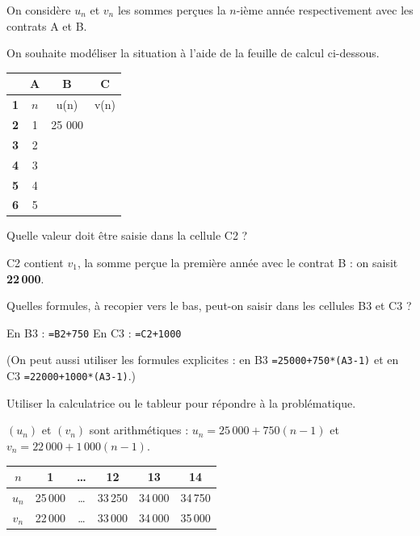 \documentclass[12pt,a4paper]{book}
\begin{document}
On considère $u_n$ et $v_n$ les sommes perçues la $n$-ième année respectivement avec les contrats A et B.

\begin{enumMet}
	\item On souhaite modéliser la situation à l'aide de la feuille de calcul ci-dessous.

\begin{center}
\begin{tabular}{|c|c|c|c|}
	\hline
	 & \textbf{A} & \textbf{B} & \textbf{C} \\
	\hline
	\textbf{1} & $n$ & u(n) & v(n) \\
	\hline
	\textbf{2} & 1 & 25 000 & \\
	\hline
	\textbf{3} & 2 & & \\
	\hline
	\textbf{4} & 3 & & \\
	\hline
	\textbf{5} & 4 & & \\
	\hline
	\textbf{6} & 5 & & \\
	\hline
\end{tabular}
\end{center}

	\begin{enumMet}
		\item Quelle valeur doit être saisie dans la cellule C2 ?

		\begin{corrBox}
			C2 contient $v_1$, la somme perçue la première année avec le contrat B : on saisit \textbf{22\,000}.
		\end{corrBox}
		\item Quelles formules, à recopier vers le bas, peut-on saisir dans les cellules B3 et C3 ?

		\begin{corrBox}
			En B3 : \texttt{=B2+750} \qquad En C3 : \texttt{=C2+1000}

			(On peut aussi utiliser les formules explicites : en B3 \texttt{=25000+750*(A3-1)} et en C3 \texttt{=22000+1000*(A3-1)}.)
		\end{corrBox}
		\item Utiliser la calculatrice ou le tableur pour répondre à la problématique.

		\begin{corrBox}
			$(u_n)$ et $(v_n)$ sont arithmétiques : $u_n=25\,000+750(n-1)$ et $v_n=22\,000+1\,000(n-1)$.

			\begin{center}
			\begin{tabular}{|c|c|c|c|c|c|}
				\hline
				$n$ & 1 & \dots & 12 & 13 & 14 \\
				\hline
				$u_n$ & 25\,000 & \dots & 33\,250 & 34\,000 & 34\,750 \\
				\hline
				$v_n$ & 22\,000 & \dots & 33\,000 & 34\,000 & 35\,000 \\
				\hline
			\end{tabular}
			\end{center}


\end{corrBox}
\end{enumMet}
\end{enumMet}
\end{document}
